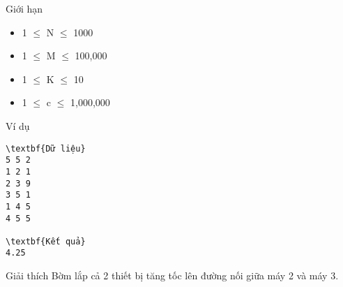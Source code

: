 Giới hạn  
\begin{itemize}
	\item     1  $\le$  N  $\le$  1000   
	\item     1  $\le$  M  $\le$  100,000   
	\item     1  $\le$  K  $\le$  10   
	\item     1  $\le$  c  $\le$  1,000,000   
\end{itemize}
   Ví dụ  
\begin{verbatim}
\textbf{Dữ liệu}
5 5 2
1 2 1
2 3 9
3 5 1
1 4 5
4 5 5

\textbf{Kết quả}
4.25
\end{verbatim}
   Giải thích  
Bờm lắp cả 2 thiết bị tăng tốc lên đường nối giữa máy 2 và máy 3.